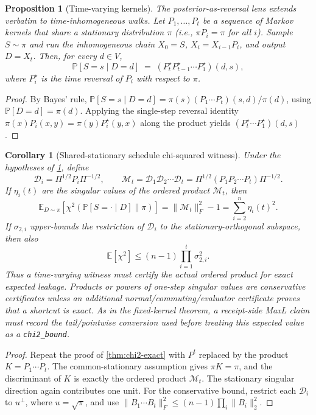 \documentclass[11pt]{article}
\newtheorem{corollary}[theorem]{Corollary}
\newtheorem{proposition}[theorem]{Proposition}
\newcommand{\E}{\mathbb{E}}
\newcommand{\Prb}{\mathbb{P}}
\newcommand{\cD}{\mathcal{D}}
\newcommand{\cM}{\mathcal{M}}
\newcommand{\PiM}{\Pi}
\begin{document}
\begin{proposition}[Time-varying kernels]\label{prop:inhom}
The posterior-as-reversal lens extends verbatim to time-inhomogeneous walks.
Let $P_1,\dots,P_t$ be a sequence of Markov kernels that share a stationary
distribution $\pi$ (i.e., $\pi P_i=\pi$ for all $i$). Sample $S\sim\pi$ and run
the inhomogeneous chain $X_0=S$, $X_{i}=X_{i-1}P_i$, and output $D=X_t$.
Then, for every $d\in V$,
\[
\Prb[S=s\mid D=d] \;=\; (P_t^\star P_{t-1}^\star\cdots P_1^\star)(d,s),
\]
where $P_i^\star$ is the time reversal of $P_i$ with respect to $\pi$.
\end{proposition}

\begin{proof}
By Bayes' rule,
$\Prb[S=s\mid D=d]=\pi(s)(P_1\cdots P_t)(s,d)/\pi(d)$, using $\Prb[D=d]=\pi(d)$.
Applying the single-step reversal identity $\pi(x)P_i(x,y)=\pi(y)P_i^\star(y,x)$
along the product yields $(P_t^\star\cdots P_1^\star)(d,s)$.
\end{proof}

\begin{corollary}[Shared-stationary schedule chi-squared witness]\label{cor:inhom-chi2}
Under the hypotheses of \cref{prop:inhom}, define
\[
\cD_i=\PiM^{1/2}P_i\PiM^{-1/2},\qquad
\cM_t=\cD_1\cD_2\cdots\cD_t
=\PiM^{1/2}(P_1P_2\cdots P_t)\PiM^{-1/2}.
\]
If $\eta_i(t)$ are the singular values of the ordered product $\cM_t$, then
\[
\E_{D\sim\pi}\!\left[\chi^2(\Prb[S=\cdot\mid D]\|\pi)\right]
=\|\cM_t\|_F^2-1
=\sum_{i=2}^n\eta_i(t)^2.
\]
If $\sigma_{2,i}$ upper-bounds the restriction of $\cD_i$ to the
stationary-orthogonal subspace, then also
\[
\E[\chi^2]\le (n-1)\prod_{i=1}^t\sigma_{2,i}^{2}.
\]
Thus a time-varying witness must certify the actual ordered product for exact
expected leakage. Products or powers of one-step singular values are conservative
certificates unless an additional normal/commuting/evaluator certificate proves
that a shortcut is exact. As in the fixed-kernel theorem, a receipt-side MaxL
claim must record the tail/pointwise conversion used before treating this
expected value as a \texttt{chi2\_bound}.
\end{corollary}

\begin{proof}
Repeat the proof of \cref{thm:chi2-exact} with
$P^t$ replaced by the product $K=P_1\cdots P_t$. The common-stationary
assumption gives $\pi K=\pi$, and the discriminant of $K$ is exactly the ordered
product $\cM_t$. The stationary singular direction again contributes one unit.
For the conservative bound, restrict each $\cD_i$ to $u^\perp$, where
$u=\sqrt\pi$, and use $\|B_1\cdots B_t\|_F^2\le
(n-1)\prod_i\|B_i\|_2^2$.
\end{proof}
\end{document}
